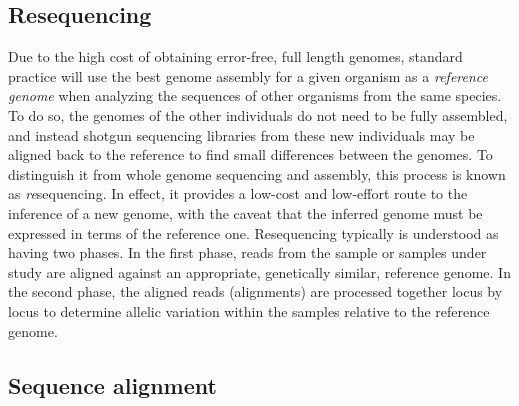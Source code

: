 \subsection{Resequencing}

Due to the high cost of obtaining error-free, full length genomes, standard practice will use the best genome assembly for a given organism as a \emph{reference genome} when analyzing the sequences of other organisms from the same species.
To do so, the genomes of the other individuals do not need to be fully assembled, and instead shotgun sequencing libraries from these new individuals may be aligned back to the reference to find small differences between the genomes.
To distinguish it from whole genome sequencing and assembly, this process is known as \emph{re}sequencing.
In effect, it provides a low-cost and low-effort route to the inference of a new genome, with the caveat that the inferred genome must be expressed in terms of the reference one.
Resequencing typically is understood as having two phases.
In the first phase, reads from the sample or samples under study are aligned against an appropriate, genetically similar, reference genome.
In the second phase, the aligned reads (alignments) are processed together locus by locus to determine allelic variation within the samples relative to the reference genome.

\subsection{Sequence alignment}
\label{sec:sequence_alignment}

